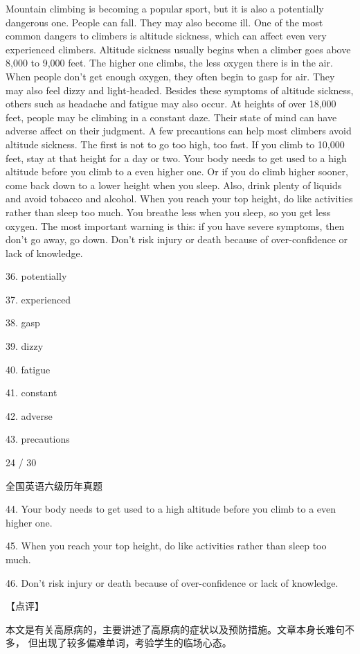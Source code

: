 \documentclass[UTF8,11pt]{ctexart}
\begin{document}
Mountain climbing is becoming a popular sport, but it is also a potentially dangerous one. People can fall. They may also become ill. One of the most common dangers to climbers is altitude sickness, which can affect even very experienced climbers. Altitude sickness usually begins when a climber goes above 8,000 to 9,000 feet. The higher one climbs, the less oxygen there is in the air. When people don’t get enough oxygen, they often begin to gasp for air. They may also feel dizzy and light-headed. Besides these symptoms of altitude sickness, others such as headache and fatigue may also occur. At heights of over 18,000 feet, people may be climbing in a constant daze. Their state of mind can have adverse affect on their judgment. A few precautions can help most climbers avoid altitude sickness. The first is not to go too high, too fast. If you climb to 10,000 feet, stay at that height for a day or two. Your body needs to get used to a high altitude before you climb to a even higher one. Or if you do climb higher sooner, come back down to a lower height when you sleep. Also, drink plenty of liquids and avoid tobacco and alcohol. When you reach your top height, do like activities rather than sleep too much. You breathe less when you sleep, so you get less oxygen. The most important warning is this: if you have severe symptoms, then don’t go away, go down. Don’t risk injury or death because of over-confidence or lack of knowledge.


36. potentially


37. experienced


38. gasp


39. dizzy


40. fatigue


41. constant


42. adverse


43. precautions


24 / 30


全国英语六级历年真题


44. Your body needs to get used to a high altitude before you climb to a even higher one.


45. When you reach your top height, do like activities rather than sleep too much.


46. Don’t risk injury or death because of over-confidence or lack of knowledge.


【点评】


本文是有关高原病的，主要讲述了高原病的症状以及预防措施。文章本身长难句不多， 但出现了较多偏难单词，考验学生的临场心态。
\end{document}
